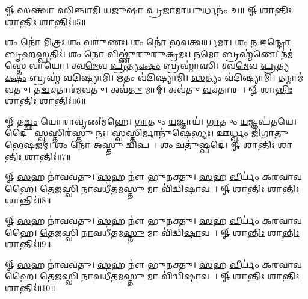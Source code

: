 𑍐 𑌸𑌨𑍍𑌤𑍍𑌵𑌾॑ 𑌸𑌿𑌞𑍍𑌚𑌾\ul{𑌮𑌿} 𑌯𑌜𑍁𑌷𑌾॑ \ul{𑌪𑍍𑌰}𑌜𑌾𑌮𑌾\ul{𑌯𑍁}𑌰𑍍𑌧𑌨𑌂॑ 𑌚॥ 𑍐 𑌶𑌾\ul{𑌨𑍍𑌤𑌿𑌃} 𑌶𑌾\ul{𑌨𑍍𑌤𑌿𑌃} 𑌶𑌾𑌨𑍍𑌤𑌿𑌃॑॥5॥


𑌶𑌂 𑌨𑍋॑ \ul{𑌮𑌿}𑌤𑍍𑌰𑌃  𑌶𑌂 𑌵𑌰𑍁॑𑌣𑌃। 𑌶𑌂 𑌨𑍋॑ 𑌭𑌵𑌤𑍍𑌵\ul{𑌰𑍍𑌯}𑌮𑌾। 𑌶𑌂 \ul{𑌨} 𑌇\ul{𑌨𑍍𑌦𑍍𑌰𑍋} 𑌬𑍃\ul{𑌹}𑌸𑍍𑌪𑌤𑌿𑌃॑। 𑌶𑌂 \ul{𑌨𑍋} 𑌵𑌿𑌷𑍍𑌣𑍁॑𑌰𑍁𑌰𑍁\ul{𑌕𑍍𑌰}𑌮𑌃। 𑌨\ul{𑌮𑍋} 𑌬𑍍𑌰𑌹𑍍𑌮॑𑌣𑍇। 𑌨𑌮॑𑌸𑍍𑌤𑍇 𑌵𑌾𑌯𑍋। 𑌤𑍍𑌵\ul{𑌮𑍇}𑌵 \ul{𑌪𑍍𑌰}𑌤𑍍𑌯\ul{𑌕𑍍𑌷𑌂} 𑌬𑍍𑌰𑌹𑍍𑌮𑌾॑𑌸𑌿। 𑌤𑍍𑌵\ul{𑌮𑍇}𑌵 \ul{𑌪𑍍𑌰}𑌤𑍍𑌯\ul{𑌕𑍍𑌷𑌂} 𑌬𑍍𑌰𑌹𑍍𑌮॑ 𑌵𑌦𑌿𑌷𑍍𑌯𑌾𑌮𑌿। \ul{𑌋}𑌤𑌂 𑌵॑𑌦𑌿𑌷𑍍𑌯𑌾𑌮𑌿। \ul{𑌸}𑌤𑍍𑌯𑌂 𑌵॑𑌦𑌿𑌷𑍍𑌯𑌾𑌮𑌿। 𑌤𑌨𑍍𑌮𑌾𑌮॑𑌵𑌤𑍁। 𑌤\ul{𑌦𑍍𑌵}𑌕𑍍𑌤𑌾𑌰॑𑌮𑌵𑌤𑍁। 𑌅𑌵॑\ul{𑌤𑍁} 𑌮𑌾𑌮𑍍। 𑌅𑌵॑𑌤𑍁 \ul{𑌵}𑌕𑍍𑌤𑌾𑌰𑌮𑍍᳚। 𑍐 𑌶𑌾\ul{𑌨𑍍𑌤𑌿𑌃} 𑌶𑌾\ul{𑌨𑍍𑌤𑌿𑌃} 𑌶𑌾𑌨𑍍𑌤𑌿𑌃॑॥6॥

𑍐 𑌤\ul{𑌚𑍍𑌛𑌂} 𑌯𑍋𑌰𑌾𑌵𑍃॑𑌣𑍀𑌮𑌹𑍇। \ul{𑌗𑌾}𑌤𑍁𑌂 \ul{𑌯}𑌜𑍍𑌞𑌾𑌯॑। \ul{𑌗𑌾}𑌤𑍁𑌂 \ul{𑌯}𑌜𑍍𑌞𑌪॑𑌤𑌯𑍇। 
𑌦𑍈𑌵𑍀𑌃᳚ \ul{𑌸𑍍𑌵}𑌸𑍍𑌤𑌿𑌰॑𑌸𑍍𑌤𑍁 𑌨𑌃। \ul{𑌸𑍍𑌵}𑌸𑍍𑌤𑌿𑌰𑍍𑌮𑌾𑌨𑍁॑𑌷𑍇𑌭𑍍𑌯𑌃। \ul{𑌊}𑌰𑍍𑌧𑍍𑌵𑌂 𑌜𑌿॑𑌗𑌾𑌤𑍁 𑌭𑍇\ul{𑌷}𑌜𑌮𑍍। 
𑌶𑌂 𑌨𑍋॑ 𑌅𑌸𑍍𑌤𑍁 \ul{𑌦𑍍𑌵𑌿}𑌪𑌦𑍇᳚। 𑌶𑌂 𑌚𑌤𑍁॑𑌷𑍍𑌪𑌦𑍇। 𑍐 𑌶𑌾\ul{𑌨𑍍𑌤𑌿𑌃} 𑌶𑌾\ul{𑌨𑍍𑌤𑌿𑌃} 𑌶𑌾𑌨𑍍𑌤𑌿𑌃॑॥7॥

𑍐 \ul{𑌸}𑌹 𑌨𑌾॑𑌵𑌵𑌤𑍁। \ul{𑌸}𑌹 𑌨𑍗॑ 𑌭𑍁𑌨𑌕𑍍𑌤𑍁। \ul{𑌸}𑌹 \ul{𑌵𑍀}𑌰𑍍𑌯𑌂॑ 𑌕𑌰𑌵𑌾𑌵𑌹𑍈। \ul{𑌤𑍇}\ul{𑌜}𑌸𑍍𑌵𑌿 \ul{𑌨𑌾}𑌵𑌧𑍀॑𑌤𑌮\ul{𑌸𑍍𑌤𑍁} 𑌮𑌾 𑌵𑌿॑𑌦𑍍𑌵𑌿\ul{𑌷𑌾}𑌵𑌹𑍈᳚। 𑍐 𑌶𑌾\ul{𑌨𑍍𑌤𑌿𑌃} 𑌶𑌾\ul{𑌨𑍍𑌤𑌿𑌃} 𑌶𑌾𑌨𑍍𑌤𑌿𑌃॑॥8॥

𑍐 \ul{𑌸}𑌹 𑌨𑌾॑𑌵𑌵𑌤𑍁। \ul{𑌸}𑌹 𑌨𑍗॑ 𑌭𑍁𑌨𑌕𑍍𑌤𑍁। \ul{𑌸}𑌹 \ul{𑌵𑍀}𑌰𑍍𑌯𑌂॑ 𑌕𑌰𑌵𑌾𑌵𑌹𑍈। \ul{𑌤𑍇}\ul{𑌜}𑌸𑍍𑌵𑌿 \ul{𑌨𑌾}𑌵𑌧𑍀॑𑌤𑌮\ul{𑌸𑍍𑌤𑍁} 𑌮𑌾 𑌵𑌿॑𑌦𑍍𑌵𑌿\ul{𑌷𑌾}𑌵𑌹𑍈᳚। 𑍐 𑌶𑌾\ul{𑌨𑍍𑌤𑌿𑌃} 𑌶𑌾\ul{𑌨𑍍𑌤𑌿𑌃} 𑌶𑌾𑌨𑍍𑌤𑌿𑌃॑॥9॥

𑍐 \ul{𑌸}𑌹 𑌨𑌾॑𑌵𑌵𑌤𑍁। \ul{𑌸}𑌹 𑌨𑍗॑ 𑌭𑍁𑌨𑌕𑍍𑌤𑍁। \ul{𑌸}𑌹 \ul{𑌵𑍀}𑌰𑍍𑌯𑌂॑ 𑌕𑌰𑌵𑌾𑌵𑌹𑍈। \ul{𑌤𑍇}\ul{𑌜}𑌸𑍍𑌵𑌿 \ul{𑌨𑌾}𑌵𑌧𑍀॑𑌤𑌮\ul{𑌸𑍍𑌤𑍁} 𑌮𑌾 𑌵𑌿॑𑌦𑍍𑌵𑌿\ul{𑌷𑌾}𑌵𑌹𑍈᳚। 𑍐 𑌶𑌾\ul{𑌨𑍍𑌤𑌿𑌃} 𑌶𑌾\ul{𑌨𑍍𑌤𑌿𑌃} 𑌶𑌾𑌨𑍍𑌤𑌿𑌃॑॥10॥
